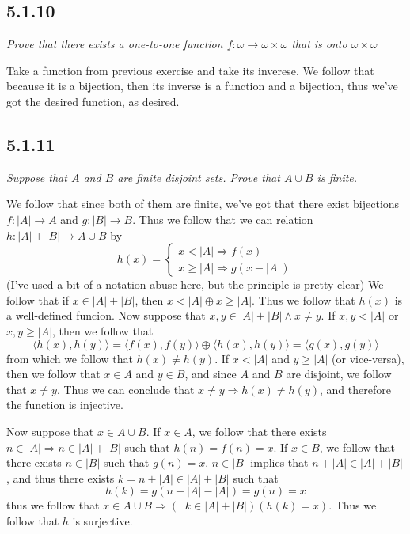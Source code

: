 \documentclass[11pt,oneside,titlepage]{book}
\DeclareMathOperator \ra {\Rightarrow}
\newcommand{\eangle}[1]{\langle #1 \rangle}
\begin{document}
\subsection*{5.1.10}

\textit{Prove that there exists a one-to-one function $f: \omega \to \omega \times \omega$
  that is onto $\omega \times \omega$}

Take a function from previous exercise and take its inverese. We follow that because it is a
bijection, then its inverse is a function and a bijection, thus we've got the desired
function, as desired.

\subsection*{5.1.11}

\textit{Suppose that $A$ and $B$ are finite disjoint sets. Prove that $A \cup B$ is finite.}

We follow that since both of them are finite, we've got that there exist bijections
$f: |A| \to A$ and $g: |B| \to B$. Thus we follow that we can relation $h : |A| + |B| \to A \cup B$
by
$$h(x) = 
\begin{cases}
  x < |A| \ra f(x) \\
  x \geq |A| \ra g(x - |A|)
\end{cases}
$$
(I've used a bit of a notation abuse here, but the principle is pretty clear)
We follow that if $x \in |A| + |B|$, then $x < |A| \oplus x \geq |A|$. Thus we follow that
$h(x)$ is a well-defined funcion. Now suppose that $x, y \in |A| + |B| \land x \neq y$.
If $x, y < |A|$ or $x, y \geq |A|$, then we follow that
$$\eangle{h(x), h(y)} = \eangle{f(x), f(y)} \oplus  \eangle{h(x), h(y)} = \eangle{g(x), g(y)}$$
from which we follow that $h(x) \neq h(y)$. If $x < |A|$ and $y \geq |A|$ (or vice-versa),
then we follow that $x \in A$ and $y \in B$, and since $A$ and $B$ are disjoint,
we follow that $x \neq y$.
Thus we can conclude that $x \neq y \ra h(x) \neq h(y)$, and therefore the function is injective.

Now suppose that $x \in A \cup B$. If $x \in A$, we follow that there exists
$n \in |A| \ra n \in |A| + |B|$ such
that $h(n) = f(n) = x$.
If $x \in B$, we follow that there exists $n \in |B|$ such that $g(n) = x$.
$n \in |B|$ implies that $n + |A| \in |A| + |B|$, and thus there exists
$k = n + |A| \in |A| + |B|$ such that
$$h(k) = g(n + |A| - |A|) = g(n) = x$$
thus we follow that $x \in A \cup B \ra (\exists k \in |A| + |B|)(h(k) = x)$. Thus we follow that
$h$ is surjective.
\end{document}
